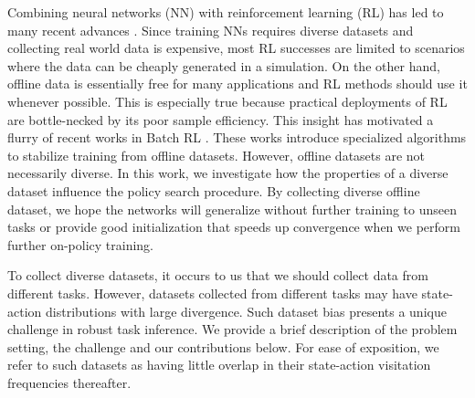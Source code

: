 Combining neural networks (NN) with reinforcement learning (RL) has led to many recent advances \cite{SOP, PPO, Haarnoja18, TRPO, SPU}.
Since training NNs requires diverse datasets and collecting real world data is expensive, most RL successes are limited to scenarios where the data can be cheaply generated in a simulation.
On the other hand, offline data is essentially free for many applications and RL methods should use it whenever possible.
This is especially true because practical deployments of RL are bottle-necked by its poor sample efficiency.
This insight has motivated a flurry of recent works in Batch RL \cite{siegel2020keep,agarwal2019optimistic,kumar2019stabilizing,fujimoto2019off,chen2019bail}.
These works introduce specialized algorithms to stabilize training from offline datasets.
However, offline datasets are not necessarily diverse.
In this work, we investigate how the properties of a diverse dataset influence the policy search procedure.
By collecting diverse offline dataset, we hope the networks will generalize without further training to unseen tasks or provide good initialization that speeds up convergence when we perform further on-policy training.

To collect diverse datasets, it occurs to us that we should collect data from different tasks.
However, datasets collected from different tasks may have state-action distributions with large divergence.
Such dataset bias presents a unique challenge in robust task inference.
We provide a brief description of the problem setting, the challenge and our contributions below.
For ease of exposition, we refer to such datasets as having little overlap in their state-action visitation frequencies thereafter.

